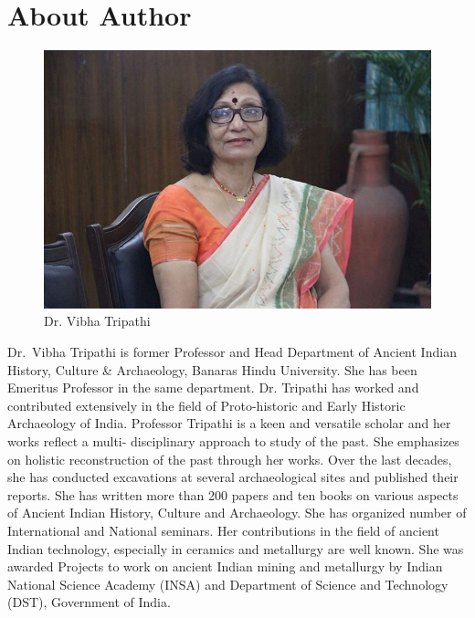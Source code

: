 \chapter*{About Author}\label{author}



\vspace{-.8cm}

\begin{figure}[H]
\includegraphics[scale=1]{images/author.jpg}
\caption*{Dr. Vibha Tripathi}
\end{figure}

\vspace{-.5cm}

Dr.~Vibha Tripathi is former Professor and Head Department of Ancient Indian History, Culture \& Archaeology, Banaras Hindu University. She has been Emeritus Professor in the same department. Dr. Tripathi has worked and contributed extensively in the field of Proto-historic and Early Historic Archaeology of India. Professor Tripathi is a keen and versatile scholar and her works reflect a multi- disciplinary approach to study of the past. She emphasizes on holistic reconstruction of the past through her works. Over the last decades, she has conducted excavations at several archaeological sites and published their reports. She has written more than 200 papers and ten books on various aspects of Ancient Indian History, Culture and Archaeology. She has organized number of International and National seminars. Her contributions in the field of ancient Indian technology, especially in ceramics and metallurgy are well known. She was awarded Projects to work on ancient Indian mining and metallurgy by Indian National Science Academy (INSA) and Department of Science and Technology (DST), Government of India. 

